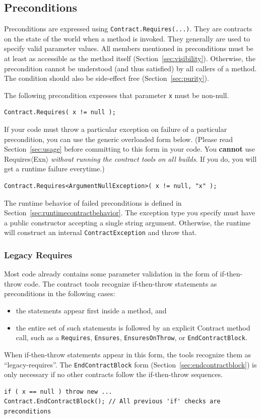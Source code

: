 \documentclass{article}
\newcommand{\code}[1]{\lstinline{#1}}
\newcommand{\requiresn}[1]{{Requires}$\langle$#1$\rangle$}
\begin{document}
\subsection{Preconditions}
\label{sec:preconditions}
Preconditions are expressed using \code{Contract.Requires(...)}. They are
contracts on the state of the world when a method is invoked. They generally
are used to specify valid parameter values. All members mentioned in
preconditions must be at least as accessible as the method itself
(Section~\ref{sec:visibility}).
Otherwise, the precondition cannot be understood (and thus satisfied) by
all callers of a method. The condition should also be side-effect free
(Section~\ref{sec:purity}).

The following precondition expresses that parameter \code{x} must be non-null.
\begin{lstlisting}
Contract.Requires( x != null );
\end{lstlisting}

If your code must throw a particular exception on failure of a
particular precondition, you can use the generic overloaded form
below. (Please read Section~\ref{sec:usage} before committing
to this form in your code.  You \textbf{cannot} use
\requiresn{Exn} \emph{without running the contract tools on all
  builds}. If you do, you will get a runtime failure everytime.)
\begin{lstlisting}
Contract.Requires<ArgumentNullException>( x != null, "x" );
\end{lstlisting}
The runtime behavior of failed preconditions is defined in
Section~\ref{sec:runtimecontractbehavior}. The exception type you
specify must have a public constructor accepting a single string
argument. Otherwise, the runtime will construct an internal
\code{ContractException} and throw that.

\subsubsection{Legacy Requires}
\label{sec:legacythrows}
Most code already contains some parameter validation in the form of
if-then-throw code. The contract tools recognize if-then-throw statements 
as preconditions in the following cases:
\begin{itemize}
\item the statements appear first inside a method, and
\item the entire set of such statements is followed by an explicit
  Contract method call, such as a \code{Requires}, \code{Ensures}, 
  \code{EnsuresOnThrow}, or \code{EndContractBlock}.
\end{itemize}
When if-then-throw statements appear in this form, the tools recognize
them as ``legacy-requires''. The \code{EndContractBlock} form
(Section~\ref{sec:endcontractblock}) is only necessary
if no other contracts follow the if-then-throw sequences.
\begin{lstlisting}
if ( x == null ) throw new ...
Contract.EndContractBlock(); // All previous 'if' checks are preconditions
\end{lstlisting}
\end{document}
